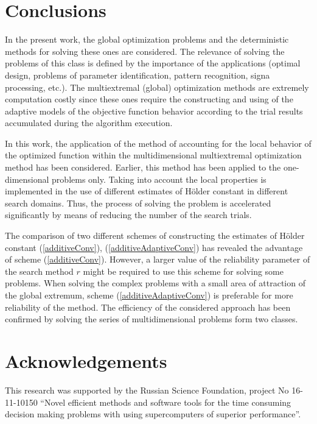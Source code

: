 \documentclass[procedia]{easychair}
\begin{document}
\section{Conclusions}
In the present work, the global optimization problems and the deterministic methods
for solving these ones are considered. The relevance of solving the problems of this
class is defined by the importance of the applications (optimal design, problems of
parameter identification, pattern recognition, signa processing, etc.). The multiextremal
(global) optimization methods are extremely computation costly since these ones require
the constructing and using of the adaptive models of the objective function behavior
according to the trial results accumulated during the algorithm execution.
\par
In this work, the application of the method of accounting for the local behavior of
the optimized function within the multidimensional multiextremal optimization method
has been considered. Earlier, this method has been applied to the one-dimensional
problems only. Taking into account the local properties is implemented in the use of
different estimates of Hölder constant in different search domains. Thus, the process
of solving the problem is accelerated significantly by means of reducing the number of
the search trials.
\par
The comparison of two different schemes of constructing the estimates of Hölder constant
(\ref{additiveConv}), (\ref{additiveAdaptiveConv}) has revealed the advantage of scheme (\ref{additiveConv}).
However, a larger value of the reliability parameter of the search method \(r\) might be required
to use this scheme for solving some problems. When solving the complex problems with a small
area of attraction of the global extremum, scheme (\ref{additiveAdaptiveConv}) is preferable for
more reliability of the method. The efficiency of the considered approach has been confirmed
by solving the series of multidimensional problems form two classes.

\section{Acknowledgements}
This research was supported by the Russian Science Foundation, project No 16-11-10150
``Novel efficient methods and software tools for the time consuming decision making problems
with using supercomputers of superior performance''.

%
\label{sect:bib}
%
%

%



\end{document}

